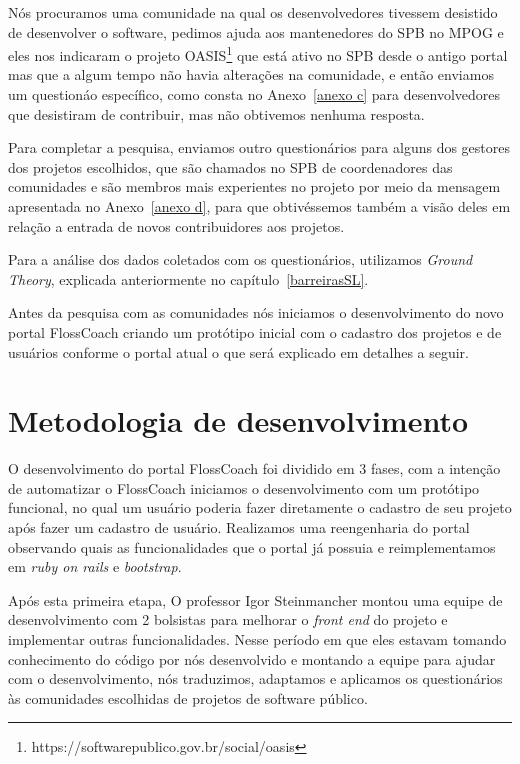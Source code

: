 Nós procuramos uma comunidade na qual os desenvolvedores tivessem desistido
de desenvolver o software, pedimos ajuda aos mantenedores do SPB no MPOG e eles nos 
indicaram o projeto OASIS\footnote{https://softwarepublico.gov.br/social/oasis} que 
está ativo no SPB desde o antigo portal mas que a algum tempo não havia alterações
na comunidade, e então enviamos um questionáo específico, como consta no Anexo~\ref{anexo c} 
para desenvolvedores que desistiram de contribuir, mas não obtivemos nenhuma resposta. 

Para completar a pesquisa, enviamos outro questionários para alguns dos gestores dos
projetos escolhidos, que são chamados no SPB de coordenadores das comunidades e 
são membros mais experientes no projeto por meio da mensagem apresentada no Anexo~\ref{anexo d}, 
para que obtivéssemos também a visão deles em relação a entrada de novos contribuidores aos projetos. 

Para a análise dos dados coletados com os questionários, utilizamos \textit{Ground Theory}, 
explicada anteriormente no capítulo~\ref{barreirasSL}.

Antes da pesquisa com as comunidades nós iniciamos o desenvolvimento do novo portal
FlossCoach criando um protótipo inicial com o cadastro dos projetos e de usuários 
conforme o portal atual o que será explicado em detalhes a seguir. 

\section{Metodologia de desenvolvimento}

O desenvolvimento do portal FlossCoach foi dividido em 3 fases, com a intenção de 
automatizar o FlossCoach iniciamos o desenvolvimento com um protótipo funcional, no qual 
um usuário poderia fazer diretamente o cadastro de seu projeto após fazer um cadastro de 
usuário. Realizamos uma reengenharia do portal observando quais as funcionalidades 
que o portal já possuia e reimplementamos em \textit{ruby on rails} e \textit{bootstrap}.

Após esta primeira etapa, O professor Igor Steinmancher montou uma equipe de desenvolvimento 
com 2 bolsistas para melhorar o \textit{front end} do projeto e implementar outras funcionalidades. 
Nesse período em que eles 
estavam tomando conhecimento do código por nós desenvolvido e montando a equipe para
ajudar com o desenvolvimento, nós traduzimos, adaptamos e aplicamos os questionários
às comunidades escolhidas de projetos de software público.

